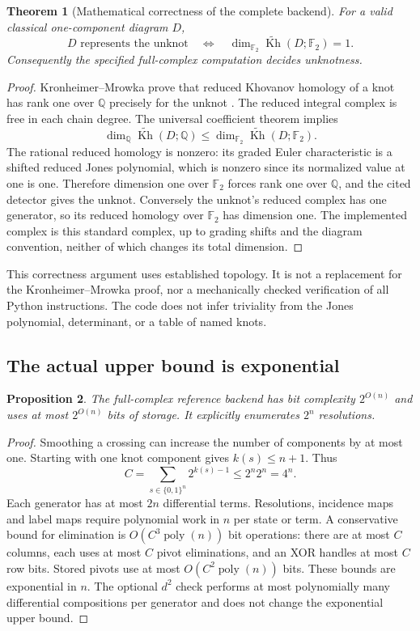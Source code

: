 \documentclass[11pt]{article}
\newtheorem{theorem}{Theorem}[section]
\newtheorem{proposition}[theorem]{Proposition}
\theoremstyle{remark}\newtheorem{remark}[theorem]{Remark}
\newcommand{\F}{\mathbb F_2}
\newcommand{\Q}{\mathbb Q}
\newcommand{\Kh}{\widetilde{\operatorname{Kh}}}
\begin{document}
\begin{theorem}[Mathematical correctness of the complete backend]
For a valid classical one-component diagram $D$,
\[
 D\text{ represents the unknot}
 \quad\Longleftrightarrow\quad
 \dim_{\F}\Kh(D;\F)=1.
\]
Consequently the specified full-complex computation decides unknotness.
\end{theorem}
\begin{proof}
Kronheimer--Mrowka prove that reduced Khovanov homology of a knot has rank one
over $\Q$ precisely for the unknot \cite{km}. The reduced integral complex is
free in each chain degree. The universal coefficient theorem implies
\[
 \dim_{\Q}\Kh(D;\Q)\le \dim_{\F}\Kh(D;\F).
\]
The rational reduced homology is nonzero: its graded Euler characteristic is
a shifted reduced Jones polynomial, which is nonzero since its normalized
value at one is one. Therefore dimension one over $\F$ forces rank one over
$\Q$, and the cited detector gives the unknot. Conversely the unknot's reduced
complex has one generator, so its reduced homology over $\F$ has dimension
one. The implemented complex is this standard complex, up to grading shifts
and the diagram convention, neither of which changes its total dimension.
\end{proof}

This correctness argument uses established topology. It is not a replacement
for the Kronheimer--Mrowka proof, nor a mechanically checked verification of
all Python instructions. The code does not infer triviality from the Jones
polynomial, determinant, or a table of named knots.

\subsection{The actual upper bound is exponential}
\begin{proposition}
The full-complex reference backend has bit complexity $2^{O(n)}$ and uses at
most $2^{O(n)}$ bits of storage. It explicitly enumerates $2^n$ resolutions.
\end{proposition}
\begin{proof}
Smoothing a crossing can increase the number of components by at most one.
Starting with one knot component gives $k(s)\le n+1$. Thus
\[
 C=\sum_{s\in\{0,1\}^n}2^{k(s)-1}\le 2^n2^n=4^n.
\]
Each generator has at most $2n$ differential terms. Resolutions, incidence
maps and label maps require polynomial work in $n$ per state or term. A
conservative bound for elimination is $O(C^3\operatorname{poly}(n))$ bit
operations: there are at most $C$ columns, each uses at most $C$ pivot
eliminations, and an XOR handles at most $C$ row bits. Stored pivots use at
most $O(C^2\operatorname{poly}(n))$ bits. These bounds are exponential in $n$.
The optional $d^2$ check performs at most polynomially many differential
compositions per generator and does not change the exponential upper bound.
\end{proof}
\end{document}
